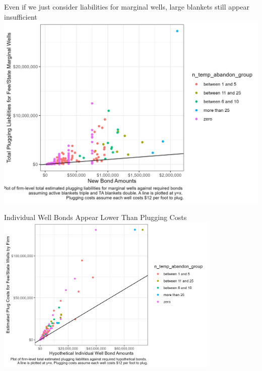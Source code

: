 \documentclass{beamer}
\begin{document}
\begin{frame}{Even if we just consider liabilities for marginal wells, large blankets still appear insufficient}
\vspace{-.3cm}
    \includegraphics[width=0.8\linewidth]{Figures/TripleDoubleBond_v_MarginalCosts.jpg}
\end{frame}


\begin{frame}{Individual Well Bonds Appear Lower Than Plugging Costs}
\label{Fig2}
\vspace{-0.5cm}
\centering
\includegraphics[width=0.8\textwidth]{Figures/PerFoot_v_Costs.jpg}    
\end{frame}
\end{document}
